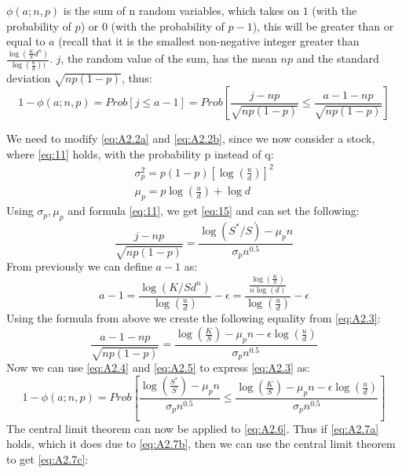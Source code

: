 \documentclass{article}
\begin{document}
$\phi(a; n, p)$ is the sum of n random variables, which takes on $1$ (with the probability of $p$) or $0$ (with the probability of $p - 1$), this will be greater than or equal to $a$ (recall that it is the smallest non-negative integer greater than $\frac{\log(\frac{K}{S} d^n)}{\log(\frac{u}{d}))}$. $j$, the random value of the sum, has the mean $n p$ and the standard deviation $\sqrt{n p (1 - p)}$, thus:
\begin{equation}\label{eq:A2.3}
    1 - \phi(a; n, p) = Prob[j \le a - 1] = Prob\left[\frac{j - n p}{\sqrt{n p (1 - p)}} \le \frac{a - 1 - n p}{\sqrt{n p (1 - p)}}\right]
\end{equation}

We need to modify \ref{eq:A2.2a} and \ref{eq:A2.2b}, since we now consider a stock, where \ref{eq:11} holds, with the probability p instead of q:
\begin{gather}
    \sigma_p^2 = p (1 - p) [\log(\frac{u}{d})]^2 \\
    \mu_p = p \log(\frac{u}{d}) + \log d 
\end{gather}
Using $\sigma_p, \mu_p$ and formula \ref{eq:11}, we get \ref{eq:15} and can set the following:
\begin{equation}\label{eq:A2.4}
    \frac{j - n p}{\sqrt{n p (1 - p)}} = \frac{\log(S^* / S) - \mu_p n}{\sigma_p n^{0.5}}
\end{equation}
From previously we can define $a - 1$ as:
\begin{equation}
    a - 1 = \frac{\log(K / S d^n)}{\log(\frac{u}{d})} - \epsilon = \frac{\frac{\log(\frac{K}{S})}{n \log(d)}}{\log(\frac{u}{d})} - \epsilon
\end{equation}
Using the formula from above we create the following equality from \ref{eq:A2.3}:
\begin{equation}\label{eq:A2.5}
    \frac{a - 1 - n p}{\sqrt{n p (1 - p)}} = \frac{\log(\frac{K}{S}) - \mu_p n - \epsilon \log(\frac{u}{d})}{\sigma_p n^{0.5}}
\end{equation}
Now we can use \ref{eq:A2.4} and \ref{eq:A2.5} to express \ref{eq:A2.3} as:
\begin{equation}\label{eq:A2.6}
    1 - \phi(a; n, p) = Prob\left[\frac{\log(\frac{S^*}{S}) - \mu_p n}{\sigma_p n^{0.5}} \le \frac{\log(\frac{K}{S}) - \mu_p n - \epsilon \log(\frac{u}{d})}{\sigma_p n^{0.5}}\right]
\end{equation}
The central limit theorem can now be applied to \ref{eq:A2.6}. Thus if \ref{eq:A2.7a} holds, which it does due to \ref{eq:A2.7b}, then we can use the central limit theorem to get \ref{eq:A2.7c}:\\
\end{document}
